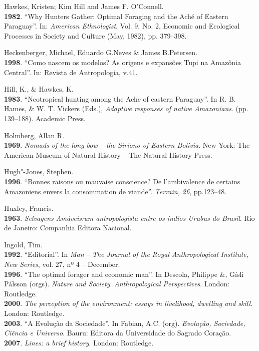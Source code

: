 \begin{Parskip}
Hawkes, Kristen; Kim Hill and James F. O'Connell.\\
\textbf{1982}. ``Why Hunters Gather: Optimal Foraging and the Aché of
Eastern Paraguay''. In: \emph{American Ethnologist}. Vol. 9, No. 2,
Economic and Ecological Processes in Society and Culture (May, 1982),
pp. 379--398.

Heckenberger, Michael, Eduardo G.Neves \& James B.Petersen.\\
\textbf{1998}. ``Como nascem os modelos? As origens e expansões Tupi na
Amazônia Central''. In: Revista de Antropologia, v.41.

Hill, K., \& Hawkes, K.\\
\textbf{1983}. ``Neotropical hunting among the Ache of eastern
Paraguay''. In R. B. Hames, \& W. T. Vickers (Eds.), \emph{Adaptive
responses of native Amazonians}. (pp. 139--188). Academic Press.

Holmberg, Allan R.\\
\textbf{1969}. \emph{Nomads of the long bow -- the Siriono of Eastern
Bolivia}. New York: The American Museum of Natural History -- The
Natural History Press.

Hugh"-Jones, Stephen.\\
\textbf{1996}. ``Bonnes raisons ou mauvaise conscience? De l'ambivalence
de certains Amazoniens envers la consommation de viande''. \emph{Terrain,
26}, pp.123--48.

Huxley, Francis.\\
\textbf{1963}. \emph{Selvagens Amáveis:um antropologista entre os índios
Urubus do Brasil}. Rio de Janeiro: Companhia Editora Nacional.

Ingold, Tim.\\
\textbf{1992}. ``Editorial''. In \emph{Man} -- \emph{The Journal of the
Royal Anthropological Institute}, \emph{New Series}, vol. 27, nº 4 --
December.\\
\textbf{1996}. ``The optimal forager and economic man''. In Descola,
Philippe \&, Gísli Pálsson (orgs). \emph{Nature and Society}:
\emph{Anthropological Perspectives}. London: Routledge.\\
\textbf{2000}. \emph{The perception of the environment: essays in
livelihood, dwelling and skill}. London: Routledge.\\
\textbf{2003}. ``A Evolução da Sociedade''. In Fabian, A.C. (org).
\emph{Evolução, Sociedade, Ciência e Universo}. Bauru: Editora da
Universidade do Sagrado Coração.\\
\textbf{2007}. \emph{Lines: a brief history}. London: Routledge.


\end{Parskip}
